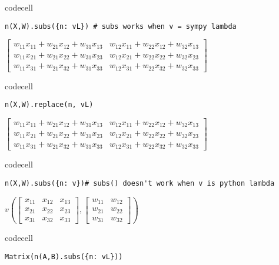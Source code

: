 codecell

\begin{verbatim}
n(X,W).subs({n: vL}) # subs works when v = sympy lambda
\end{verbatim}

$\displaystyle \left[\begin{matrix}w_{11} x_{11} + w_{21} x_{12} + w_{31} x_{13} & w_{12} x_{11} + w_{22} x_{12} + w_{32} x_{13}\\w_{11} x_{21} + w_{21} x_{22} + w_{31} x_{23} & w_{12} x_{21} + w_{22} x_{22} + w_{32} x_{23}\\w_{11} x_{31} + w_{21} x_{32} + w_{31} x_{33} & w_{12} x_{31} + w_{22} x_{32} + w_{32} x_{33}\end{matrix}\right]$

codecell

\begin{verbatim}
n(X,W).replace(n, vL)
\end{verbatim}

$\displaystyle \left[\begin{matrix}w_{11} x_{11} + w_{21} x_{12} + w_{31} x_{13} & w_{12} x_{11} + w_{22} x_{12} + w_{32} x_{13}\\w_{11} x_{21} + w_{21} x_{22} + w_{31} x_{23} & w_{12} x_{21} + w_{22} x_{22} + w_{32} x_{23}\\w_{11} x_{31} + w_{21} x_{32} + w_{31} x_{33} & w_{12} x_{31} + w_{22} x_{32} + w_{32} x_{33}\end{matrix}\right]$

codecell

\begin{verbatim}
n(X,W).subs({n: v})# subs() doesn't work when v is python lambda
\end{verbatim}

$\displaystyle v{\left(\left[\begin{matrix}x_{11} & x_{12} & x_{13}\\x_{21} & x_{22} & x_{23}\\x_{31} & x_{32} & x_{33}\end{matrix}\right],\left[\begin{matrix}w_{11} & w_{12}\\w_{21} & w_{22}\\w_{31} & w_{32}\end{matrix}\right] \right)}$

codecell

\begin{verbatim}
Matrix(n(A,B).subs({n: vL}))
\end{verbatim}


